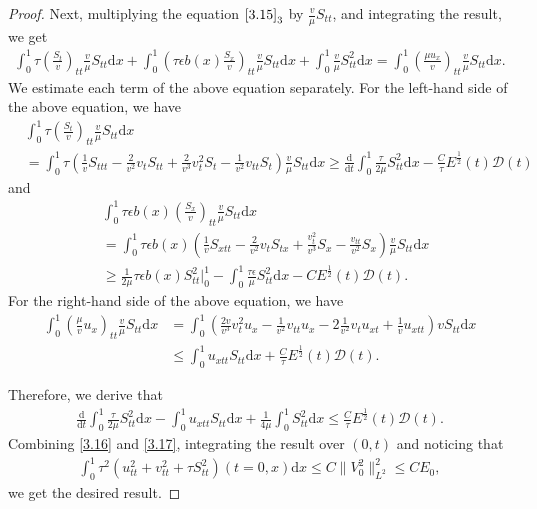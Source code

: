 \documentclass[10pt,reqno]{amsart}
\numberwithin{equation}{section}
\newcommand{\dif}{\mathrm{d}}
\begin{document}
\begin{proof}
Next, multiplying the equation $\eqref{3.15}_3$ by $\frac{v}{\mu} S_{tt}$, and integrating the result, we get
\begin{align*}
\int_0^1 \tau \left(\frac{S_t}{v}\right)_{tt} \frac{v}{\mu} S_{tt} \dif x+\int_0^1\left( \tau\epsilon b(x) \frac{S_x}{v}\right)_{tt} \frac{v}{\mu} S_{tt}\dif x+\int_0^1 \frac{v}{\mu} S_{tt}^2 \dif x 
=\int_0^1 \left(\frac{\mu u_x}{v}\right)_{tt} \frac{v}{\mu} S_{tt} \dif x.
\end{align*}
We estimate each term of the above equation separately.  For the left-hand side of the above equation, we have
\begin{align*}
&\int_0^1 \tau \left(\frac{S_t}{v}\right)_{tt} \frac{v}{\mu} S_{tt} \dif x\\
&=\int_0^1 \tau \left( \frac{1}{v} S_{ttt}-\frac{2}{v^2} v_t S_{tt}+\frac{2}{v^3}v_t^2 S_t-\frac{1}{v^2} v_{tt} S_t\right) \frac{v}{\mu} S_{tt} \dif x \ge \frac{\dif}{\dif t} \int_0^1 \frac{\tau}{2\mu}  S_{tt}^2 \dif x-\frac{C}{\tau} E^\frac{1}{2}(t) \mathcal D(t)
\end{align*}
and
\begin{align*}
&\int_0^1 \tau \epsilon b(x) \left(\frac{S_x}{v}\right)_{tt} \frac{v}{\mu} S_{tt}\dif x\\
&=\int_0^1 \tau \epsilon b(x) \left( \frac{1}{v} S_{xtt}-\frac{2}{v^2} v_t S_{tx}+\frac{v_t^2}{v^3} S_x-\frac{v_{tt}}{v^2} S_x\right) \frac{v}{\mu} S_{tt} \dif x \\
&\ge \frac{1}{2\mu} \tau \epsilon b(x) S_{tt}^2\big|_0^1-\int_0^1 \frac{\tau \epsilon}{\mu} S_{tt}^2 \dif x-C E^\frac{1}{2}(t) \mathcal D(t).
\end{align*}
For the right-hand side of the above equation, we have
\begin{align*}
\int_0^1 \left(\frac{\mu}{v} u_x\right)_{tt} \frac{v}{\mu} S_{tt}\dif x
&=\int_0^1 \left(\frac{2v}{v^3} v_t^2u_x-\frac{1}{v^2} v_{tt}u_x-2 \frac{1}{v^2} v_t u_{xt}+\frac{1}{v} u_{xtt}\right) v S_{tt} \dif x\\
&\le \int_0^1 u_{xtt} S_{tt} \dif x +\frac{C}{\tau} E^\frac{1}{2}(t) \mathcal D(t).
\end{align*}

Therefore, we derive that
\begin{align}\label{3.17}
\frac{\dif}{\dif t} \int_0^1 \frac{\tau}{2\mu} S_{tt}^2 \dif x-\int_0^1 u_{xtt} S_{tt}\dif x+\frac{1}{4\mu} \int_0^1 S_{tt}^2\dif x \le \frac{C}{\tau} E^\frac{1}{2}(t) \mathcal D(t).
\end{align}
Combining \eqref{3.16} and \eqref{3.17}, integrating  the result over $(0, t)$ and noticing that 
\begin{align*}
\int_0^1 \tau^2 \left(  u_{tt}^2+  v_{tt}^2+ \tau S_{tt}^2 \right)    (t=0, x)\dif x
 \le C \|V_0^2\|_{L^2}^2 \le CE_0,
\end{align*}
we get the desired result.
\end{proof}
\end{document}
